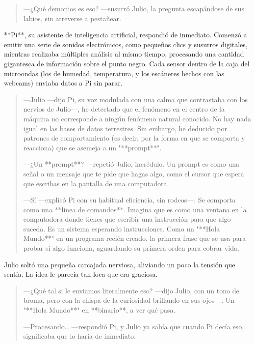 \documentclass[a4paper,12pt]{book}
\begin{document}
\begin{quote}
    —¿Qué demonios es eso? —susurró Julio, la pregunta escapándose de sus labios, sin atreverse a pestañear.
\end{quote}

**Pi**, su asistente de inteligencia artificial, respondió de inmediato. Comenzó a emitir una serie de sonidos electrónicos, como pequeños clics y susurros digitales, mientras realizaba múltiples análisis al mismo tiempo, procesando una cantidad gigantesca de información sobre el punto negro. Cada sensor dentro de la caja del microondas (los de humedad, temperatura, y los escáneres hechos con las webcams) enviaba datos a Pi sin parar.

\begin{quote}
    —Julio —dijo Pi, su voz modulada con una calma que contrastaba con los nervios de Julio—, he detectado que el fenómeno en el centro de la máquina no corresponde a ningún fenómeno natural conocido. No hay nada igual en las bases de datos terrestres. Sin embargo, he deducido por patrones de comportamiento (es decir, por la forma en que se comporta y reacciona) que se asemeja a un "**prompt**".

    —¿Un **prompt**? —repetió Julio, incrédulo. Un prompt es como una señal o un mensaje que te pide que hagas algo, como el cursor que espera que escribas en la pantalla de una computadora.

    —Sí —explicó Pi con su habitual eficiencia, sin rodeos—. Se comporta como una **línea de comandos**. Imagina que es como una ventana en la computadora donde tienes que escribir una instrucción para que algo suceda. Es un sistema esperando instrucciones. Como un "**Hola Mundo**" en un programa recién creado, la primera frase que se usa para probar si algo funciona, aguardando su primera orden para cobrar vida.
\end{quote}

Julio soltó una pequeña carcajada nerviosa, aliviando un poco la tensión que sentía. La idea le parecía tan loca que era graciosa.

\begin{quote}
    —¿Qué tal si le enviamos literalmente eso? —dijo Julio, con un tono de broma, pero con la chispa de la curiosidad brillando en sus ojos—. Un "**Hola Mundo**" en **binario**, a ver qué pasa.

    —Procesando… —respondió Pi, y Julio ya sabía que cuando Pi decía eso, significaba que lo haría de inmediato.
\end{quote}
\end{document}
